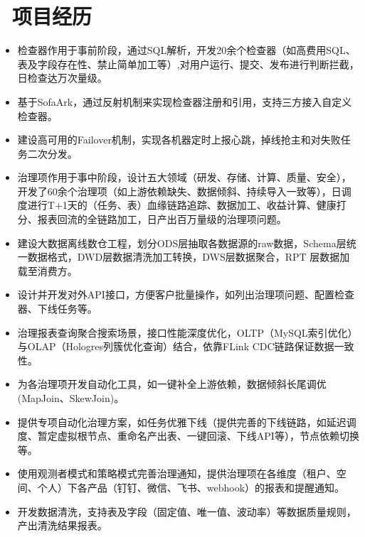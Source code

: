 \documentclass{resume}
\begin{document}
\section{\faUsers\ 项目经历}
\vspace{-0.5ex}
\begin{onehalfspacing}
\begin{itemize}
  \item 检查器作用于事前阶段，通过SQL解析，开发20余个检查器（如高费用SQL、表及字段存在性、禁止简单加工等）,对用户运行、提交、发布进行判断拦截，日检查达万次量级。
  \item 基于SofaArk，通过反射机制来实现检查器注册和引用，支持三方接入自定义检查器。
  \item 建设高可用的Failover机制，实现各机器定时上报心跳，掉线抢主和对失败任务二次分发。
\end{itemize}
\end{onehalfspacing}

\vspace{-1.5ex}

\vspace{-0.5ex}
\begin{onehalfspacing}
\begin{itemize}
  \item 治理项作用于事中阶段，设计五大领域（研发、存储、计算、质量、安全），开发了60余个治理项（如上游依赖缺失、数据倾斜、持续导入一致等），日调度进行T+1天的（任务、表）血缘链路追踪、数据加工、收益计算、健康打分、报表回流的全链路加工，日产出百万量级的治理项问题。
  \item 建设大数据离线数仓工程，划分ODS层抽取各数据源的raw数据，Schema层统一数据格式，DWD层数据清洗加工转换，DWS层数据聚合，RPT
层数据加载至消费方。
  \item 设计并开发对外API接口，方便客户批量操作，如列出治理项问题、配置检查器、下线任务等。
  \item 治理报表查询聚合搜索场景，接口性能深度优化，OLTP（MySQL索引优化）与OLAP（Hologres列簇优化查询）结合，依靠FLink CDC链路保证数据一致性。
\end{itemize}
\end{onehalfspacing}

\vspace{-0.5ex}
\begin{onehalfspacing}
\begin{itemize}
  \item 为各治理项开发自动化工具，如一键补全上游依赖，数据倾斜长尾调优(MapJoin、SkewJoin)。
  \item 提供专项自动化治理方案，如任务优雅下线（提供完善的下线链路，如延迟调度、暂定虚拟根节点、重命名产出表、一键回滚、下线API等），节点依赖切换等。
  \item 使用观测者模式和策略模式完善治理通知，提供治理项在各维度（租户、空间、个人）下各产品（钉钉、微信、飞书、webhook）的报表和提醒通知。
  \item 开发数据清洗，支持表及字段（固定值、唯一值、波动率）等数据质量规则，产出清洗结果报表。
\end{itemize}
\end{onehalfspacing}
\end{document}
